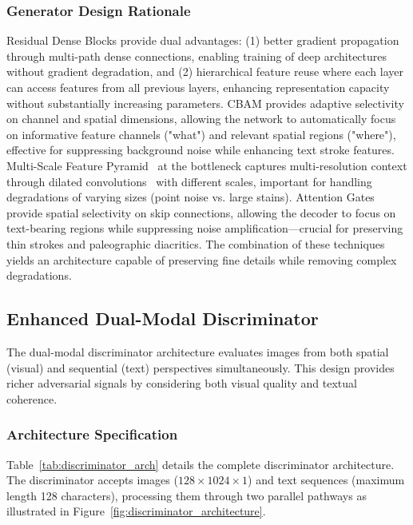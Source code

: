 \documentclass[journal]{IEEEtran}
\begin{document}
\subsubsection{Generator Design Rationale}

Residual Dense Blocks provide dual advantages: (1) better gradient propagation through multi-path dense connections, enabling training of deep architectures without gradient degradation, and (2) hierarchical feature reuse where each layer can access features from all previous layers, enhancing representation capacity without substantially increasing parameters. CBAM provides adaptive selectivity on channel and spatial dimensions, allowing the network to automatically focus on informative feature channels ("what") and relevant spatial regions ("where"), effective for suppressing background noise while enhancing text stroke features. Multi-Scale Feature Pyramid~\cite{lin2017fpn} at the bottleneck captures multi-resolution context through dilated convolutions~\cite{chen2017deeplab} with different scales, important for handling degradations of varying sizes (point noise vs. large stains). Attention Gates~\cite{oktay2018attention} provide spatial selectivity on skip connections, allowing the decoder to focus on text-bearing regions while suppressing noise amplification—crucial for preserving thin strokes and paleographic diacritics. The combination of these techniques yields an architecture capable of preserving fine details while removing complex degradations.

\subsection{Enhanced Dual-Modal Discriminator}

The dual-modal discriminator architecture evaluates images from both spatial (visual) and sequential (text) perspectives simultaneously. This design provides richer adversarial signals by considering both visual quality and textual coherence.

\subsubsection{Architecture Specification}

Table~\ref{tab:discriminator_arch} details the complete discriminator architecture. The discriminator accepts images ($128 \times 1024 \times 1$) and text sequences (maximum length 128 characters), processing them through two parallel pathways as illustrated in Figure~\ref{fig:discriminator_architecture}.
\end{document}
